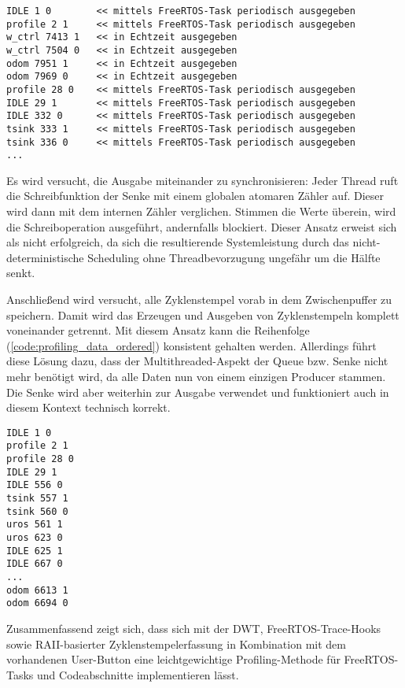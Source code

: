 \begin{code}
\begin{verbatim}
IDLE 1 0        << mittels FreeRTOS-Task periodisch ausgegeben
profile 2 1     << mittels FreeRTOS-Task periodisch ausgegeben
w_ctrl 7413 1   << in Echtzeit ausgegeben
w_ctrl 7504 0   << in Echtzeit ausgegeben
odom 7951 1     << in Echtzeit ausgegeben
odom 7969 0     << in Echtzeit ausgegeben
profile 28 0    << mittels FreeRTOS-Task periodisch ausgegeben
IDLE 29 1       << mittels FreeRTOS-Task periodisch ausgegeben
IDLE 332 0      << mittels FreeRTOS-Task periodisch ausgegeben
tsink 333 1     << mittels FreeRTOS-Task periodisch ausgegeben
tsink 336 0     << mittels FreeRTOS-Task periodisch ausgegeben
...
\end{verbatim}
    \label{code:profiling_data}
\end{code}

Es wird versucht, die Ausgabe miteinander zu synchronisieren: Jeder Thread ruft
die Schreibfunktion der Senke mit einem globalen atomaren Zähler auf. Dieser
wird dann mit dem internen Zähler verglichen. Stimmen die Werte überein, wird
die Schreiboperation ausgeführt, andernfalls blockiert. Dieser Ansatz erweist
sich als nicht erfolgreich, da sich die resultierende Systemleistung durch das
nicht-deterministische Scheduling ohne Threadbevorzugung ungefähr um die Hälfte
senkt.

Anschließend wird versucht, alle Zyklenstempel vorab in dem Zwischenpuffer zu
speichern. Damit wird das Erzeugen und Ausgeben von Zyklenstempeln komplett
voneinander getrennt. Mit diesem Ansatz kann die Reihenfolge
(\ref{code:profiling_data_ordered}) konsistent gehalten werden. Allerdings führt
diese Lösung dazu, dass der Multithreaded-Aspekt der Queue bzw. Senke nicht mehr
benötigt wird, da alle Daten nun von einem einzigen Producer stammen. Die Senke
wird aber weiterhin zur Ausgabe verwendet und funktioniert auch in diesem
Kontext technisch korrekt.

\begin{code}
\begin{verbatim}
IDLE 1 0
profile 2 1
profile 28 0
IDLE 29 1
IDLE 556 0
tsink 557 1
tsink 560 0
uros 561 1
uros 623 0
IDLE 625 1
IDLE 667 0
...
odom 6613 1
odom 6694 0
\end{verbatim}
    \label{code:profiling_data_ordered}
\end{code}

Zusammenfassend zeigt sich, dass sich mit der DWT, FreeRTOS-Trace-Hooks sowie
RAII-basierter Zyklenstempelerfassung in Kombination mit dem vorhandenen
User-Button eine leichtgewichtige Profiling-Methode für FreeRTOS-Tasks und
Codeabschnitte implementieren lässt.
